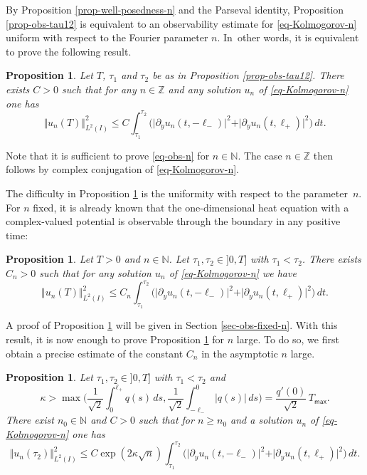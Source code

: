 \documentclass[JEP,XML,SOM,Unicode]{cedram}
\theoremstyle{plain}
\newtheorem{proposition}[theorem]{Proposition}
\theoremstyle{definition}
\newcommand{\abs}[1]{\vert #1\vert}
\newcommand{\nr}[1]{\Vert #1\Vert}
\newcommand{\1}{\mathds 1}
\newcommand{\N}{\mathbb{N}}
\newcommand{\Z}{\mathbb{Z}}
\newcommand{\Tmax}{T_{\mathsf{max}}}
\begin{document}
By Proposition \ref{prop-well-posedness-n} and the Parseval identity, Proposition \ref{prop-obs-tau12} is equivalent to an observability estimate for \eqref{eq-Kolmogorov-n} uniform with respect to the Fourier parameter $n$. In~other words, it is equivalent to prove the following result.

\begin{proposition} \label{prop-observability-n}
Let $T$, $\tau_1$ and $\tau_2$ be as in Proposition \ref{prop-obs-tau12}. There exists $C>0$ such that for any $n \in \mathbb{Z}$ and any solution $u_n$ of \eqref{eq-Kolmogorov-n} one has
\begin{equation} \label{eq-obs-n}
\Vert u_n(T) \Vert_{L^2(I)}^2 \leq C \int_{\tau_1}^{\tau_2} \bigl(\vert \partial_y u_n(t,-\ell_-)\vert^2 + \vert \partial_y u_n(t,\ell_+) \vert^2 \bigr) \, dt.
\end{equation}
\end{proposition}

Note that it is sufficient to prove \eqref{eq-obs-n} for $n \in \N$. The case $n \in \Z$ then follows by complex conjugation of \eqref{eq-Kolmogorov-n}.

The difficulty in Proposition \ref{prop-observability-n} is the uniformity with respect to the parameter~$n$. For $n$ fixed, it is already known that the one-dimensional heat equation with a complex-valued potential is observable through the boundary in any positive time:

\begin{proposition} \label{prop-obs-fix-n}
Let $T>0$ and $n \in \mathbb{N}$. Let $\tau_1,\tau_2 \in{}]0,T]$ with $\tau_1 < \tau_2$. There exists $C_n > 0$ such that for any solution $u_n$ of \eqref{eq-Kolmogorov-n} we have
\begin{equation} \label{equ_obsineq_fixedn}
\nr{u_n(T)}_{L^2(I)}^2 \leq C_n \int_{\tau_1}^{\tau_2} \bigl(\abs {\partial_y u_n(t,-\ell_-)}^2 + \abs{\partial_y u_n(t,\ell_+)}^2 \bigr) \, dt.
\end{equation}
\end{proposition}

A proof of Proposition \ref{prop-obs-fix-n} will be given in Section \ref{sec-obs-fixed-n}. With this result, it is now enough to prove Proposition \ref{prop-observability-n} for $n$ large. To do so, we first obtain a precise estimate
of the constant $C_n$ in the asymptotic $n$ large.

\begin{proposition} \label{prop-obs-large-n}
Let $\tau_1,\tau_2 \in{}]0,T]$ with $\tau_1 < \tau_2$ and
\[
\kappa > \max \biggl(\frac 1 {\sqrt 2} \int_0^{\ell_+} q(s) \, ds , \frac 1 {\sqrt 2} \int_{-\ell_-}^{0} \vert q(s)\vert \, ds \biggr) = \frac {q'(0)}{\sqrt 2}\, \Tmax.
\]
There exist $n_0 \in \N$ and $C > 0$ such that for $n \geq n_0$ and a solution $u_n$ of \eqref{eq-Kolmogorov-n} one has
\[
\nr{u_n(\tau_2)}_{L^2(I)}^2 \leq C \exp(2 \kappa \sqrt{n}) {\int_{\tau_1}^{\tau_2} \bigl(\vert \partial_y u_n(t,-\ell_-)\vert^2 + \vert \partial_y u_n(t,\ell_+) \vert^2 \bigr) \, dt}.
\]
\end{proposition}
\end{document}
